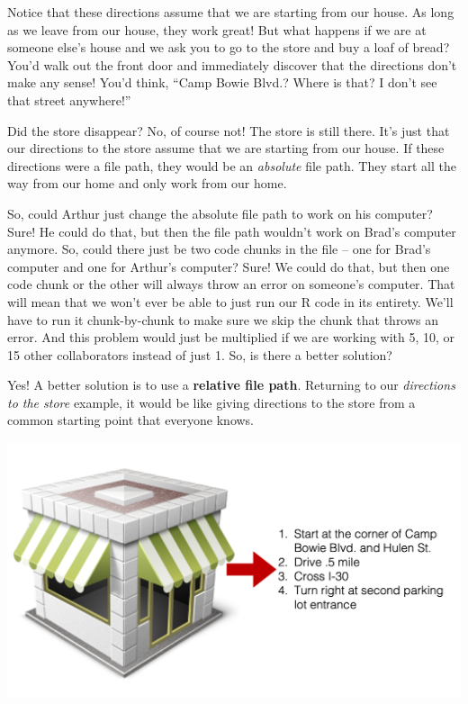 \documentclass[
  letterpaper,
  DIV=11,
  numbers=noendperiod]{scrreprt}
\begin{document}
Notice that these directions assume that we are starting from our house.
As long as we leave from our house, they work great! But what happens if
we are at someone else's house and we ask you to go to the store and buy
a loaf of bread? You'd walk out the front door and immediately discover
that the directions don't make any sense! You'd think, ``Camp Bowie
Blvd.? Where is that? I don't see that street anywhere!''

Did the store disappear? No, of course not! The store is still there.
It's just that our directions to the store assume that we are starting
from our house. If these directions were a file path, they would be an
\emph{absolute} file path. They start all the way from our home and only
work from our home.

So, could Arthur just change the absolute file path to work on his
computer? Sure! He could do that, but then the file path wouldn't work
on Brad's computer anymore. So, could there just be two code chunks in
the file -- one for Brad's computer and one for Arthur's computer? Sure!
We could do that, but then one code chunk or the other will always throw
an error on someone's computer. That will mean that we won't ever be
able to just run our R code in its entirety. We'll have to run it
chunk-by-chunk to make sure we skip the chunk that throws an error. And
this problem would just be multiplied if we are working with 5, 10, or
15 other collaborators instead of just 1. So, is there a better
solution?

Yes! A better solution is to use a \textbf{relative file path}.
Returning to our \emph{directions to the store} example, it would be
like giving directions to the store from a common starting point that
everyone knows.

\includegraphics{chapters/file_paths/directions_relative.png}
\end{document}
